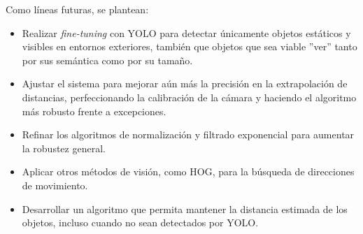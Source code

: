 Como líneas futuras, se plantean:

\begin{itemize}
\item Realizar \textit{fine-tuning} con YOLO para detectar únicamente objetos estáticos y visibles en entornos exteriores, también que objetos que sea viable ''ver'' tanto por sus semántica como por su tamaño.
\item Ajustar el sistema para mejorar aún más la precisión en la extrapolación de distancias, perfeccionando la calibración de la cámara y haciendo el algoritmo más robusto frente a excepciones.
\item Refinar los algoritmos de normalización y filtrado exponencial para aumentar la robustez general.
\item Aplicar otros métodos de visión, como HOG, para la búsqueda de direcciones de movimiento.
\item Desarrollar un algoritmo que permita mantener la distancia estimada de los objetos, incluso cuando no sean detectados por YOLO.
\end{itemize}

    